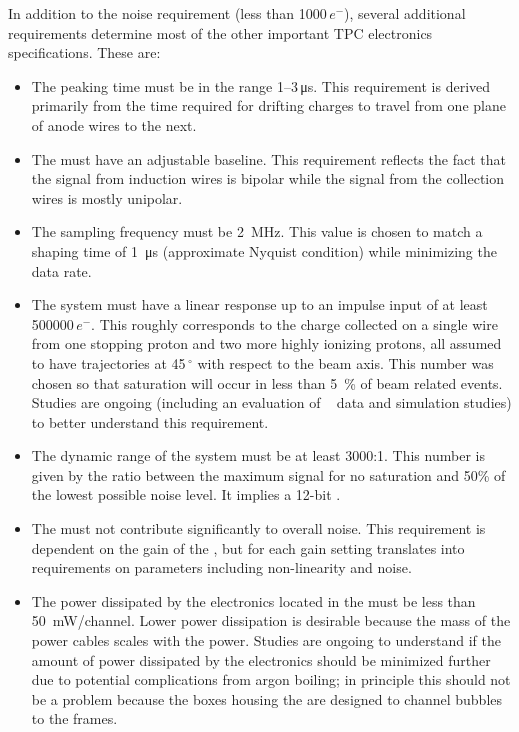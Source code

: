 In addition to the noise requirement (less than \num{1000}\,$e^{-}$), several additional requirements determine most of the other important TPC electronics specifications.  These are:

\begin{itemize}
\item{The  peaking time must  %
be  in the range \numrange{1}{3}\,\si{\micro\second}.  This requirement is derived primarily from the time required for drifting charges to travel from one plane of anode wires to the next.}
\item{The  must %
 have an adjustable baseline.  This requirement reflects the fact that the signal from induction wires is bipolar while the signal from the collection wires is mostly unipolar.}
\item{The  sampling frequency must %
be \SI{2}{MHz}.  This value is chosen to match a  shaping time of \SI{1}{\micro\second} (approximate Nyquist condition) while minimizing the data rate.}
\item{The system must 
have a linear response up to an impulse input of at least \num{500000}\,$e^{-}$.  This roughly corresponds to the charge collected on a single wire from one stopping proton and two more highly ionizing protons, all assumed to have trajectories at \num{45}\,$^{\circ}$ with respect to the beam axis.  This number was chosen so that saturation will occur in less than \SI{5}{\%} of beam related events.  Studies are ongoing (including an evaluation of \lariat~\cite{Cavanna:2014iqa} data and simulation studies) to better understand this requirement.}
\item{The dynamic range of the system must be at least \num{3000}:\num{1}. This number is given by the ratio between the maximum signal for no saturation and 50\% of the lowest possible noise level.  It implies a \num{12}-bit .}
\item{The  must not contribute significantly to overall  noise. This requirement is dependent on the gain of the , but for each gain setting translates into requirements on  parameters including non-linearity and noise.}
\item{The power dissipated by the electronics located in the \lar must 
be less than \SI{50}{mW/channel}.  Lower power dissipation is desirable because the mass of the power cables scales with the power.  Studies are ongoing to understand if the amount of power dissipated by the electronics should be minimized further due to potential complications from argon boiling; in principle this should not be a problem because the  boxes housing the  are designed to channel bubbles to the  frames.}
\end{itemize}

